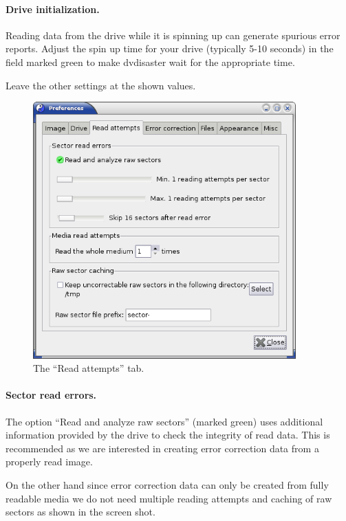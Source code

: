 \paragraph{Drive initialization.} Reading data from the drive while it is spinning
up can generate spurious error reports. Adjust the spin up time for your
drive (typically 5-10 seconds) in the field marked green to make dvdisaster
wait for the appropriate time.

\bigskip

Leave the other settings at the shown values.

\newpage

\begin{figure}[h]
\centerline{\includegraphics[width=0.9\textwidth]{screenshots/eccfile-prefs-read-attempts.png}}
\caption{The ``Read attempts'' tab.}  
\label{howto-eccfile-prefs-read-attempts}
\end{figure}

\paragraph{Sector read errors.} The option ``Read and analyze raw sectors'' (marked green)
uses additional information provided by the drive to check the integrity of read data.
This is recommended as we are interested in creating error correction data
from a properly read image.

\medskip

On the other hand since error correction data can only be created from fully
readable media we do not need multiple reading attempts and caching of
raw sectors as shown in the screen shot. 

